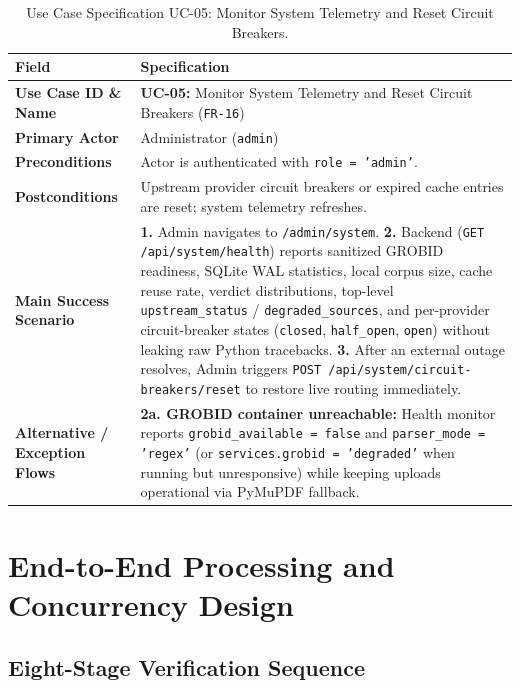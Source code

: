 \begin{table}[!htbp]
\centering
\caption{Use Case Specification UC-05: Monitor System Telemetry and Reset Circuit Breakers.}\label{tab:uc05}
\begin{tabular}{|L{0.24}|L{0.76}|}
\hline
\textbf{Field} & \textbf{Specification} \\
\hline
\textbf{Use Case ID \& Name} & \textbf{UC-05:} Monitor System Telemetry and Reset Circuit Breakers (\texttt{FR-16}) \\
\hline
\textbf{Primary Actor} & Administrator (\texttt{admin}) \\
\hline
\textbf{Preconditions} & Actor is authenticated with \texttt{role = 'admin'}. \\
\hline
\textbf{Postconditions} & Upstream provider circuit breakers or expired cache entries are reset; system telemetry refreshes. \\
\hline
\textbf{Main Success Scenario} & \textbf{1.} Admin navigates to \texttt{/admin/system}. \newline \textbf{2.} Backend (\texttt{GET /api/system/health}) reports sanitized GROBID readiness, SQLite WAL statistics, local corpus size, cache reuse rate, verdict distributions, top-level \texttt{upstream\_status} / \texttt{degraded\_sources}, and per-provider circuit-breaker states (\texttt{closed}, \texttt{half\_open}, \texttt{open}) without leaking raw Python tracebacks. \newline \textbf{3.} After an external outage resolves, Admin triggers \texttt{POST /api/system/circuit-breakers/reset} to restore live routing immediately. \\
\hline
\textbf{Alternative / Exception Flows} & \textbf{2a. GROBID container unreachable:} Health monitor reports \texttt{grobid\_available = false} and \texttt{parser\_mode = 'regex'} (or \texttt{services.grobid = 'degraded'} when running but unresponsive) while keeping uploads operational via PyMuPDF fallback. \\
\hline
\end{tabular}
\end{table}

\section{End-to-End Processing and Concurrency Design}

\subsection{Eight-Stage Verification Sequence}

